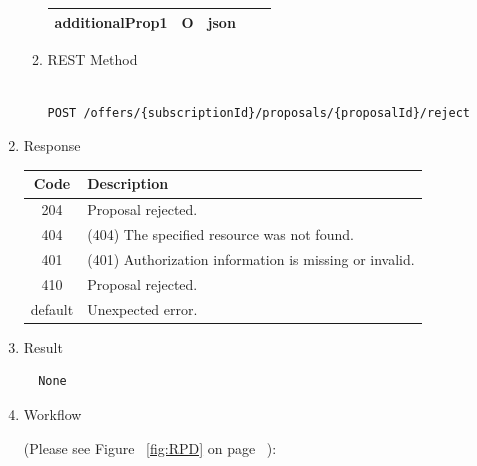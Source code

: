 \begin{enumerate}
\begin{enumerate}
\begin{center}
\begin{tabular}{|p{3cm}|l|p{3cm}|p{3cm}|p{4cm}|}
\hline

additionalProp1 	& O &	json			&		& 		\\

\hline

\end{tabular}
\end{center}

\item REST Method

\begin{tcolorbox}[boxrule=0pt, frame empty]
\begin{verbatim} 

POST /offers/{subscriptionId}/proposals/{proposalId}/reject

\end{verbatim}
\end{tcolorbox}

\end{enumerate}

\item Response

\begin{center}
\begin{tabular}{|c|l|} 
\hline
\rowcolor{lightgray}	Code 		& 	Description \\
\hline
204	 		&	Proposal rejected.  \\
\hline
404			&	(404) The specified resource was not found. \\
\hline
401			&	(401) Authorization information is missing or invalid. \\
\hline
410			&	Proposal rejected. \\
\hline
default		&	Unexpected error. \\
\hline
\end{tabular}
\end{center}


\item Result

\begin{tcolorbox}[boxrule=0pt, frame empty]
\begin{verbatim}
  None
\end{verbatim}
\end{tcolorbox}

\item Workflow

(Please see Figure ~\ref{fig:RPD} on page ~\pageref{fig:RPD}):


\end{enumerate}
